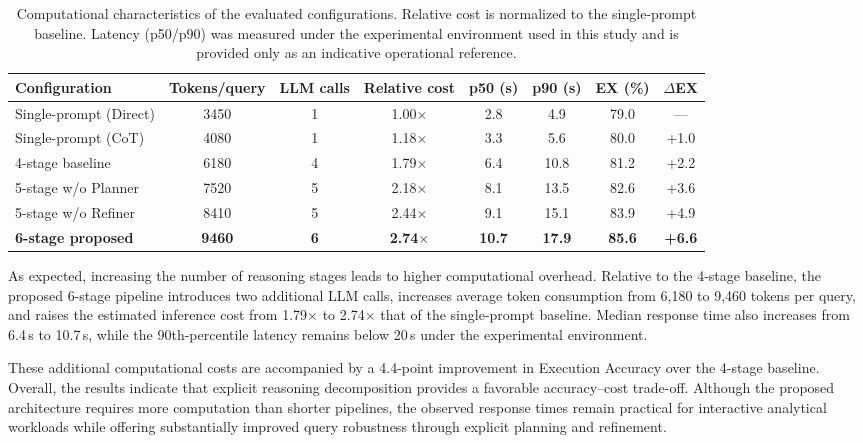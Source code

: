 \documentclass{svproc}
\begin{document}
\begin{table}[t]
\caption{Computational characteristics of the evaluated configurations. Relative cost is normalized to the single-prompt baseline. Latency (p50/p90) was measured under the experimental environment used in this study and is provided only as an indicative operational reference.}
\label{tab:cost}
\centering
\scriptsize
\begin{tabular*}{\textwidth}{@{\extracolsep{\fill}}lccccccc@{}}
\toprule
\textbf{Configuration} & \textbf{Tokens/query} & \textbf{LLM calls} & \textbf{Relative cost} & \textbf{p50 (s)} & \textbf{p90 (s)} & \textbf{EX (\%)} & \textbf{$\Delta$EX} \\
\midrule
Single-prompt (Direct) & 3450 & 1 & 1.00$\times$ & 2.8 & 4.9 & 79.0 & --- \\
Single-prompt (CoT) & 4080 & 1 & 1.18$\times$ & 3.3 & 5.6 & 80.0 & +1.0 \\
4-stage baseline & 6180 & 4 & 1.79$\times$ & 6.4 & 10.8 & 81.2 & +2.2 \\
5-stage w/o Planner & 7520 & 5 & 2.18$\times$ & 8.1 & 13.5 & 82.6 & +3.6 \\
5-stage w/o Refiner & 8410 & 5 & 2.44$\times$ & 9.1 & 15.1 & 83.9 & +4.9 \\
\textbf{6-stage proposed} & \textbf{9460} & \textbf{6} & \textbf{2.74$\times$} & \textbf{10.7} & \textbf{17.9} & \textbf{85.6} & \textbf{+6.6} \\
\bottomrule
\end{tabular*}
\end{table}

As expected, increasing the number of reasoning stages leads to higher computational overhead. Relative to the 4-stage baseline, the proposed 6-stage pipeline introduces two additional LLM calls, increases average token consumption from 6,180 to 9,460 tokens per query, and raises the estimated inference cost from 1.79$\times$ to 2.74$\times$ that of the single-prompt baseline. Median response time also increases from 6.4\,s to 10.7\,s, while the 90th-percentile latency remains below 20\,s under the experimental environment.

These additional computational costs are accompanied by a 4.4-point improvement in Execution Accuracy over the 4-stage baseline. Overall, the results indicate that explicit reasoning decomposition provides a favorable accuracy--cost trade-off. Although the proposed architecture requires more computation than shorter pipelines, the observed response times remain practical for interactive analytical workloads while offering substantially improved query robustness through explicit planning and refinement.
\end{document}
